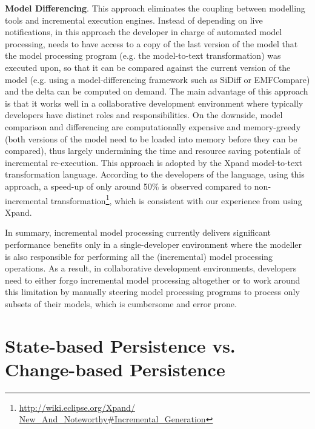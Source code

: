 \textbf{Model Differencing}. This approach eliminates the coupling between 
modelling tools and incremental execution engines. Instead of depending on 
live notifications, in this approach the developer in charge of automated model 
processing, needs to have access to a copy of the last version of the model that 
the model processing program (e.g. the model-to-text transformation) was 
executed upon, so that it can be compared against the current version of 
the model (e.g. using a model-differencing framework such as SiDiff or 
EMFCompare) and the delta can be computed on demand. The main advantage of 
this approach is that it works well in a collaborative development environment 
where typically developers have distinct roles and responsibilities. On the 
downside, model comparison and differencing are computationally expensive and 
memory-greedy (both versions of the model need to be loaded into memory before 
they can be compared), thus largely undermining the time and resource saving 
potentials of incremental re-execution. This approach is adopted by the Xpand 
model-to-text transformation language. According to the developers of the 
language, using this approach, a speed-up of only around 50\% is observed 
compared to non-incremental transformation\footnote{\url{http://wiki.eclipse.org/Xpand/
        New_And_Noteworthy\#Incremental_Generation}}, 
which is consistent with our experience from using Xpand.

In summary, incremental model processing currently delivers significant 
performance benefits only in a single-developer environment where the modeller 
is also responsible for performing all the (incremental) model processing 
operations. As a result, in collaborative development environments, 
developers need to either forgo incremental model processing altogether 
or to work around this limitation by manually steering model processing 
programs to process only subsets of their models, which is cumbersome and 
error prone.


\section{State-based Persistence vs. Change-based Persistence}
\label{sec:state-based_model_vs_change-based_model}

